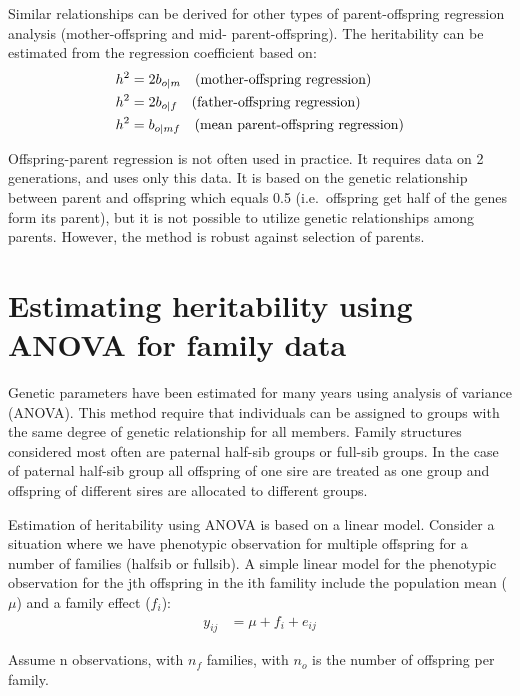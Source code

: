 \documentclass[
]{book}
\begin{document}
Similar relationships can be derived for other types of parent-offspring regression analysis (mother-offspring and mid- parent-offspring). The heritability can be estimated from the regression coefficient based on:\\
\begin{align}
    h^2 &= 2b_{o|m} \quad \text{(mother-offspring regression)} \notag \\
    h^2 &= 2b_{o|f} \quad \text{(father-offspring regression)} \notag \\
    h^2 &=  b_{o|mf} \quad \text{(mean parent-offspring regression)} \notag
\end{align}

Offspring-parent regression is not often used in practice.
It requires data on 2 generations, and uses only this data. It is based on the genetic relationship between parent and offspring which equals 0.5 (i.e.~offspring get half of the genes form its parent), but it is not possible to
utilize genetic relationships among parents. However, the method is robust against
selection of parents.

\hypertarget{estimating-heritability-using-anova-for-family-data}{%
\section{Estimating heritability using ANOVA for family data}\label{estimating-heritability-using-anova-for-family-data}}

Genetic parameters have been estimated for many years using analysis of variance
(ANOVA). This method require that individuals can be assigned to groups with the
same degree of genetic relationship for all members. Family structures considered most often
are paternal half-sib groups or full-sib groups. In the case of paternal half-sib group all
offspring of one sire are treated as one group and offspring of different sires are
allocated to different groups.

Estimation of heritability using ANOVA is based on a linear model.
Consider a situation where we have phenotypic observation for multiple offspring for a number of families (halfsib or fullsib).
A simple linear model for the phenotypic observation for the jth offspring in the ith famility include the population mean (\(\mu\)) and a family effect (\(f_i\)):
\begin{align}
 y_{ij} &= \mu + f_i + e_{ij}
\end{align}

Assume n observations, with \(n_f\) families, with \(n_o\) is the number of offspring per family.
\end{document}

